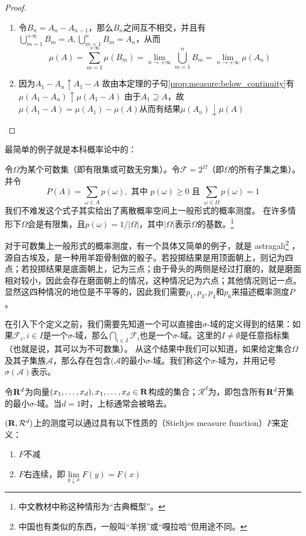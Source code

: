 \documentclass[main.tex]{subfiles}
\begin{document}
\begin{enumerate}
\begin{proof}
\begin{enumerate}
			\item 令\(B_n = A_n - A_{n-1}\)，那么\(B_n\)之间互不相交，并且有\(\bigcup_{m=1}^{+\infty} B_m = A, \bigcup_{m=1}^{n} B_m = A_n\)，从而
			\[\mu(A) = \sum_{m=1}^{+\infty}\mu(B_m) = \lim\limits_{n\rightarrow +\infty}\bigcup_{m=1}^{n} B_m = \lim\limits_{n\rightarrow +\infty}\mu(A_n)\]
			\item 因为\(A_1 - A_n \uparrow A_1 - A\) 故由本定理的子句\ref{prop:measure:below_continuity}有\(\mu(A_1 - A_n) \uparrow \mu(A_1 - A)\)
			由于\(A_1\supseteq A\)，故\(\mu(A_1 - A) = \mu(A_1) - \mu(A)\)从而有结果\(\mu(A_n)\downarrow\mu(A)\)
		\end{enumerate}
	\end{proof}
\end{enumerate}

最简单的例子就是本科概率论中的：
\begin{example}[离散概率空间] \label{ex:1.1.2} 令\(\Omega\)为某个可数集（即有限集或可数无穷集）。令\(\mathcal{F}=2^\Omega\)（即\(\Omega\)的所有子集之集）。并令
\[P(A) = \sum_{\omega \in A} p(\omega), \text{ 其中 } p(\omega) \geq 0 \text{ 且 } \sum_{\omega \in \Omega} p(\omega) = 1\]
我们不难发这个式子其实给出了离散概率空间上一般形式的概率测度。
在许多情形下\(\Omega\)会是有限集，且\(p(\omega) = 1/|\Omega|\)，其中\(|\Omega|\)表示\(\Omega\)的基数。\footnote{中文教材中称这种情形为``古典概型''。}

对于可数集上一般形式的概率测度，有一个具体又简单的例子，就是 astragali\footnote{中国也有类似的东西，一般叫``羊拐''或``嘎拉哈''但用途不同。} ，源自古埃及，是一种用羊距骨制做的骰子。若投掷结果是用顶面朝上，则记为四点；若投掷结果是底面朝上，记为三点；由于骨头的两侧是经过打磨的，就是磨面相对较小，因此会存在磨面朝上的情况，这种情况记为六点；其他情况则记一点。
显然这四种情况的地位是不平等的，因此我们需要\(p_1, p_3, p_4\)和\(p_6\)来描述概率测度\(P\)。
\end{example}

在引入下个定义之前，我们需要先知道一个可以直接由\(\sigma\)-域的定义得到的结果：如果\(\mathcal{F}_i, i\in I\)是一个\(\sigma\)-域，那么\(\bigcap_{i\in I}\mathcal{F}_i\)也是一个\(\sigma\)-域。这里的\(I \neq \emptyset\)是任意指标集（也就是说，其可以为不可数集）。
从这个结果中我们可以知道，如果给定集合\(\Omega\)及其子集族\(\mathcal{A}\)，那么存在包含\((\mathcal{A}\)的最小\(\sigma\)-域。我们称这个\(\sigma\)-域为，并用记号\(\sigma(\mathcal{A})\)表示。

令\(\mathbf{R}^d\)为向量\((x_1, \dots, x_d), x_1, \dots, x_d\in \mathbf{R}\)构成的集合；\(\mathcal{R}^d\)为，即包含所有\(\mathbf{R}^d\)开集的最小\(\sigma\)-域。当\(d=1\)时，上标通常会被略去。
\begin{example}[实直线上的测度]
	\((\mathbf{R}, \mathcal{R}^d)\)上的测度可以通过具有以下性质的（Stieltjes measure function）\(F\)来定义：
	\begin{enumerate}
		\item \(F\)不减
		\item \(F\)右连续，即\(\lim\limits_{y\downarrow x}F(y) = F(x)\)
	\end{enumerate}
\end{example}
\end{document}
